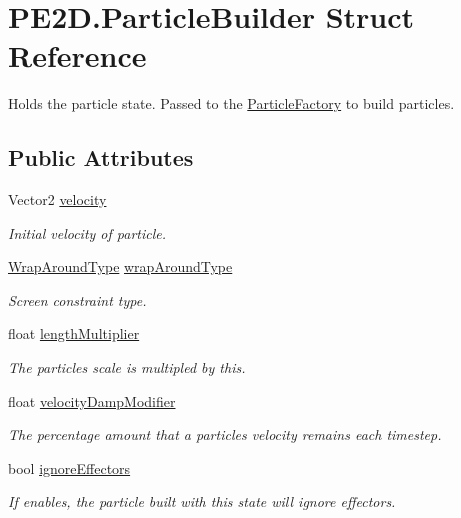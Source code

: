 \hypertarget{struct_p_e2_d_1_1_particle_builder}{}\section{P\+E2\+D.\+Particle\+Builder Struct Reference}
\label{struct_p_e2_d_1_1_particle_builder}


Holds the particle state. Passed to the \hyperlink{class_p_e2_d_1_1_particle_factory}{Particle\+Factory} to build particles.  


\subsection*{Public Attributes}
\begin{DoxyCompactItemize}
\item 
Vector2 \hyperlink{struct_p_e2_d_1_1_particle_builder_a5efd39fc998887c16fa23eff2fdf8d4d}{velocity}
\begin{DoxyCompactList}\small\item\em Initial velocity of particle. \end{DoxyCompactList}\item 
\hyperlink{namespace_p_e2_d_a510b407ed8d0de3476df258ab95e1e50}{Wrap\+Around\+Type} \hyperlink{struct_p_e2_d_1_1_particle_builder_ae8a54269a26406d7fb499c4fee198ea2}{wrap\+Around\+Type}
\begin{DoxyCompactList}\small\item\em Screen constraint type. \end{DoxyCompactList}\item 
float \hyperlink{struct_p_e2_d_1_1_particle_builder_a3079f1fec16ed4f3b83def7200345569}{length\+Multiplier}
\begin{DoxyCompactList}\small\item\em The particles scale is multipled by this. \end{DoxyCompactList}\item 
float \hyperlink{struct_p_e2_d_1_1_particle_builder_aff988495a250de55e362b008dc471f9d}{velocity\+Damp\+Modifier}
\begin{DoxyCompactList}\small\item\em The percentage amount that a particles velocity remains each timestep. \end{DoxyCompactList}\item 
bool \hyperlink{struct_p_e2_d_1_1_particle_builder_aa78452c0a3ec79744b768d945b1d6ae9}{ignore\+Effectors}
\begin{DoxyCompactList}\small\item\em If enables, the particle built with this state will ignore effectors. \end{DoxyCompactList}\item 

\end{DoxyCompactItemize}

